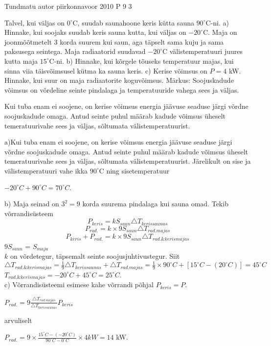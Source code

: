{Tundmatu autor} %
{piirkonnavoor} %
{2010} %
{P 9} %
{3} %
{
\ifStatement
Talvel, kui väljas on $0 ^{\circ}$C, suudab saunahoone keris kütta sauna $90^{\circ}$C-ni. 
a) Hinnake, kui soojaks suudab keris sauna kutta, kui väljas on $-20^{\circ}$C.
Maja on joonmõõtmetelt 3 korda suurem kui saun, aga täpselt sama kuju ja sama paksusega seintega. Maja radiaatorid suudavad $-20^{\circ}$C välistemperatuuri juures kutta maja $15^{\circ}$C-ni. 
b) Hinnake, kui kõrgele tõuseks temperatuur majas, kui sinna viia täisvõimsusel kütma ka sauna keris. 
c) Kerise võimsus on $P = 4$ kW. Hinnake, kui suur on maja radiaatorite koguvõimsus. 
Märkus: Soojuskadude võimsus on võrdeline seinte pindalaga ja temperatuuride vahega sees ja väljas.
\fi


\ifHint
Kui tuba enam ei soojene, on kerise võimsus energia jäävuse seaduse järgi võrdne soojuskadude omaga. Antud seinte puhul määrab kadude võimsus üheselt temeratuurivahe sees ja väljas, sõltumata välistemperatuurist.
\fi

\ifSolution
a)Kui tuba enam ei soojene, on kerise võimsus energia jäävuse seaduse järgi võrdne soojuskadude omaga. Antud seinte puhul määrab kadude võimsus üheselt temeratuurivahe sees ja väljas, sõltumata välistemperatuurist. Järelikult on sise ja välistemperatuuri vahe ikka $90^{\circ}$C ning sisetemperatuur
\begin{center}
$-20^{\circ}C + 90^{\circ}C = 70^{\circ}C$.
\end{center}
b) Maja seinad on $3^2 = 9$ korda suurema pindalaga kui sauna omad. Tekib võrrandisüsteem
\[
{P_{keris} = kS_{saun} \triangle T_{keris saunas}}
\]
\[
P_{rad.} = k \times 9S_{saun} \triangle T_{rad .majas}
\]
\[
P_{keris} + P_{rad.} = k \times 9S_{saun} \triangle T_{rad. \& keris majas}
\]
$9S_{saun}$ = $S_{maja}$
\\
$k$ on võrdetegur, täpsemalt seinte soojusjuhtivustegur. Siit \\

$\triangle T_{rad. \& keris majas} = \frac{1}{9}\triangle T_{keris saunas} + \triangle T_{rad. majas} = \frac{1}{9} \times 90^{\circ} C + [15^{\circ} C - (20 ^{\circ} C)] = 45 ^{\circ} C$ \\

$T_{rad. \& keris majas} = - 20 ^{\circ} C + 45 ^{\circ} C = 25 ^{\circ} C$.
\\
c) Võrrandisüsteemi esimese kahe võrrandi põhjal $P_{keris} = P$.
\begin{center}
$P_{rad.} = 9 \frac{\triangle T_{rad. majas}}{\triangle T_{keris saunas}} P_{keris}$
\end{center}
arvuliselt
\begin{center}
$P_{rad.} = 9 \times \frac{15^{\circ} C - (-20 ^{\circ} C)}{90 ^{\circ} C - 0^{\circ} C} \times 4 kW = 14$ kW.
\end{center}
\fi
}